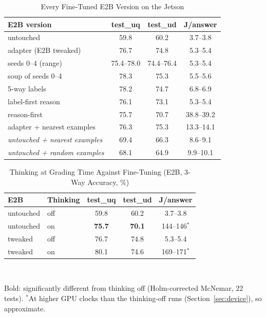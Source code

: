 \documentclass[journal]{IEEEtran}
\begin{document}
\begin{table}[!t]
\centering
\caption{Every Fine-Tuned E2B Version on the Jetson}
\label{tab:variants}
\footnotesize
\setlength{\tabcolsep}{3pt}
\begin{tabular}{@{}lccc@{}}
\toprule
E2B version & test\_uq & test\_ud & J/answer \\
\midrule
untouched & 59.8 & 60.2 & 3.7--3.8 \\
adapter (E2B tweaked) & 76.7 & 74.8 & 5.3--5.4 \\
seeds 0--4 (range) & 75.4--78.0 & 74.4--76.4 & 5.3--5.4 \\
soup of seeds 0--4 & 78.3 & 75.3 & 5.5--5.6 \\
5-way labels & 78.2 & 74.7 & 6.8--6.9 \\
label-first reason & 76.1 & 73.1 & 5.3--5.4 \\
reason-first & 75.7 & 70.7 & 38.8--39.2 \\
adapter + nearest examples & 76.3 & 75.3 & 13.3--14.1 \\
\midrule
\textit{untouched + nearest examples} & 69.4 & 66.3 & 8.6--9.1 \\
\textit{untouched + random examples} & 68.1 & 64.9 & 9.9--10.1 \\
\bottomrule
\end{tabular}
\end{table}



\begin{table}[!t]
\centering
\caption{Thinking at Grading Time Against Fine-Tuning (E2B, 3-Way Accuracy, \%)}
\label{tab:thinking}
\footnotesize
\setlength{\tabcolsep}{4pt}
\begin{tabular}{@{}llccc@{}}
\toprule
E2B & Thinking & test\_uq & test\_ud & J/answer \\
\midrule
untouched & off & 59.8 & 60.2 & 3.7--3.8 \\
untouched & on & \textbf{75.7} & \textbf{70.1} & 144--146$^\ast$ \\
tweaked & off & 76.7 & 74.8 & 5.3--5.4 \\
tweaked & on & 80.1 & 74.6 & 169--171$^\ast$ \\
\bottomrule
\end{tabular}
\\[2pt]
\raggedright Bold: significantly different from thinking off (Holm-corrected McNemar, 22 tests). $^\ast$At higher GPU clocks than the thinking-off runs (Section~\ref{sec:device}), so approximate.
\end{table}
\end{document}
